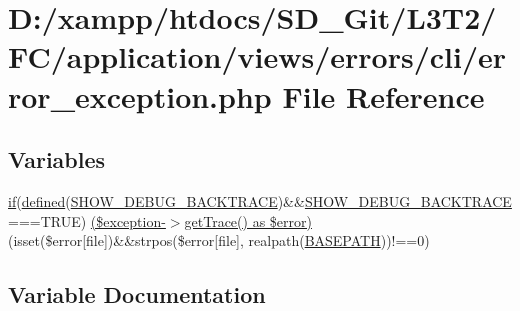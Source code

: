 \hypertarget{application_2views_2errors_2cli_2error__exception_8php}{}\section{D\+:/xampp/htdocs/\+S\+D\+\_\+\+Git/\+L3\+T2/\+F\+C/application/views/errors/cli/error\+\_\+exception.php File Reference}
\label{application_2views_2errors_2cli_2error__exception_8php}
\subsection*{Variables}
\begin{DoxyCompactItemize}
\item 
\hyperlink{_admin_2assets_2js_2bootstrap_8min_8js_a87cf461060832b8b68a7b48d9e371e4f}{if}(\hyperlink{_admin_2tests_2_bootstrap_8php_a46458e8654a714e0565e20f63021add9}{defined}(\textquotesingle{}\hyperlink{_admin_2application_2config_2constants_8php_a7e2dd6fea73799257285946411aeb5ce}{S\+H\+O\+W\+\_\+\+D\+E\+B\+U\+G\+\_\+\+B\+A\+C\+K\+T\+R\+A\+C\+E}\textquotesingle{})\&\&\hyperlink{_admin_2application_2config_2constants_8php_a7e2dd6fea73799257285946411aeb5ce}{S\+H\+O\+W\+\_\+\+D\+E\+B\+U\+G\+\_\+\+B\+A\+C\+K\+T\+R\+A\+C\+E}===T\+R\+U\+E) \hyperlink{application_2views_2errors_2cli_2error__exception_8php_a58b3444cff3fa104c28c2111a147e3d3}{(\$exception-\/$>$get\+Trace() as \$error)} (isset(\$error\mbox{[}\textquotesingle{}file\textquotesingle{}\mbox{]})\&\&strpos(\$error\mbox{[}\textquotesingle{}file\textquotesingle{}\mbox{]}, realpath(\hyperlink{_admin_2index_8php_ad39801cabfd338dc5524466fe793fda9}{B\+A\+S\+E\+P\+A\+T\+H}))!==0)
\end{DoxyCompactItemize}


\subsection{Variable Documentation}
\hypertarget{application_2views_2errors_2cli_2error__exception_8php_a58b3444cff3fa104c28c2111a147e3d3}{}
